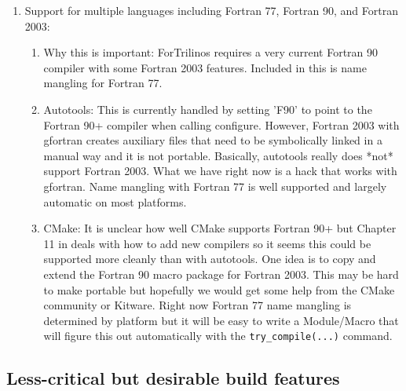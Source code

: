 \documentclass[pdf,ps2pdf,11pt]{SANDreport}
\begin{document}
\begin{enumerate}
\begin{enumerate}
  \end{enumerate}

{}\item Support for multiple languages including Fortran 77, Fortran
90, and Fortran 2003:

  \begin{enumerate}

  {}\item Why this is important: ForTrilinos requires a very current
  Fortran 90 compiler with some Fortran 2003 features.  Included in
  this is name mangling for Fortran 77.

  {}\item Autotools: This is currently handled by setting 'F90' to
  point to the Fortran 90+ compiler when calling configure.  However,
  Fortran 2003 with gfortran creates auxiliary files that need to be
  symbolically linked in a manual way and it is not portable.
  Basically, autotools really does *not* support Fortran 2003.  What
  we have right now is a hack that works with gfortran.  Name mangling
  with Fortran 77 is well supported and largely automatic on most
  platforms.

  {}\item CMake: It is unclear how well CMake supports Fortran 90+ but
  Chapter 11 in {}\cite{MasteringCMake_fourth} deals with how to add
  new compilers so it seems this could be supported more cleanly than
  with autotools. One idea is to copy and extend the Fortran 90 macro
  package for Fortran 2003.  This may be hard to make portable but
  hopefully we would get some help from the CMake community or Kitware.
  Right now Fortran 77 name mangling is determined by platform but it
  will be easy to write a Module/Macro that will figure this out
  automatically with the \texttt{try\_compile(...)} command.

  \end{enumerate}

\end{enumerate}


%
{}\subsection{Less-critical but desirable build features}
%
\end{document}
